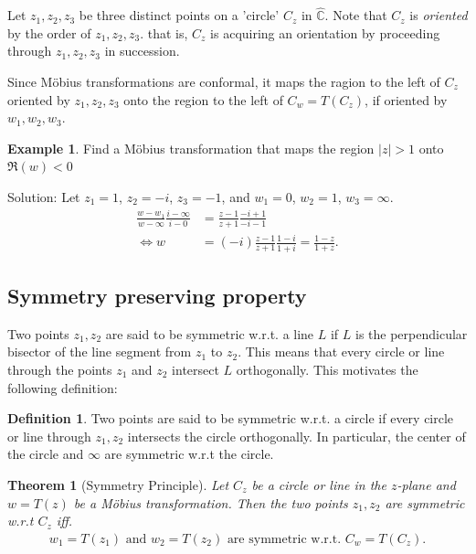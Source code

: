 \documentclass[12pt, a4paper]{article}
\theoremstyle{plain}
\newtheorem{thm}{Theorem} %
\theoremstyle{definition}
\newtheorem{definition}{Definition} %
\newtheorem{example}{Example} %
\begin{document}
			Let $z_1,z_2,z_3$ be three distinct points on a 'circle' $C_z$ in $\hat{\mathbb{C}}$. Note that $C_z$ is \textit{oriented} by the order of $z_1,z_2,z_3$. that is, $C_z$ is acquiring an orientation by proceeding through $z_1,z_2,z_3$ in succession.

			Since Möbius transformations are conformal, it maps the ragion to the left of $C_z$ oriented by $z_1,z_2,z_3$ onto the region to the left of $C_w=T(C_z)$, if oriented by $w_1,w_2,w_3$.\\

			\begin{example}
				Find a Möbius transformation that maps the region $|z|>1$ onto $\Re(w)<0$

				Solution: Let $z_1=1$, $z_2 = -i$, $z_3 = -1$, and $w_1 = 0$, $w_2 = 1$, $w_3 = \infty$.
				\begin{align*}
					\frac{w-w_1}{w-\infty}\frac{i-\infty}{i-0} &= \frac{z-1}{z+1}\frac{-i+1}{-i-1} \\\iff
					w &= (-i)\frac{z-1}{z+1}\frac{1-i}{1+i} = \frac{1-z}{1+z}.
				\end{align*}
			\end{example}
		\subsection{Symmetry preserving property} %
		\label{sub:symmetry_preserving_property}
			Two points $z_1,z_2$ are said to be symmetric w.r.t. a line $L$ if $L$ is the perpendicular bisector of the line segment from $z_1$ to $z_2$. This means that every circle or line through the points $z_1$ and $z_2$ intersect $L$ orthogonally. This motivates the following definition:\\

			\begin{definition}
				Two points are said to be symmetric w.r.t. a circle if every circle or line through $z_1,z_2$ intersects the circle orthogonally. In particular, the center of the circle and $\infty$ are symmetric w.r.t the circle.\\
			\end{definition}

			\begin{thm}[Symmetry Principle]
				Let $C_z$ be a circle or line in the $z$-plane and $w=T(z)$ be a Möbius transformation. Then the two points $z_1,z_2$ are symmetric w.r.t $C_z$ iff.
				\begin{align*}
					w_1 = T(z_1)\text{ and } w_2=T(z_2)\text{ are symmetric w.r.t. $C_w=T(C_z)$}.
				\end{align*}
			\end{thm}
\end{document}
